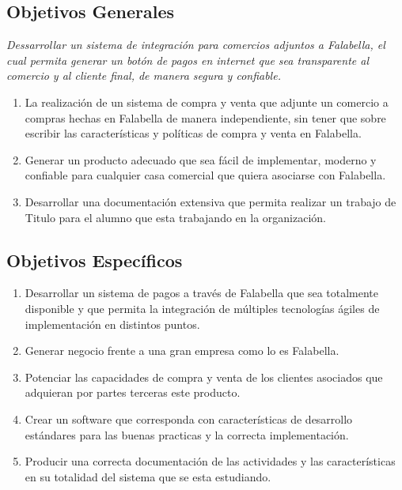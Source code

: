 \documentclass[a4paper,12pt,openany,oneside]{book}
\begin{document}
\subsection{Objetivos Generales}
\textit{Dessarrollar un sistema de integración para comercios adjuntos a Falabella, el cual permita generar un botón de pagos en internet que sea transparente al comercio y al cliente final, de manera segura y confiable.}
\begin{enumerate}
\item La realización de un sistema de compra y venta que adjunte un comercio a compras hechas en Falabella de manera independiente, sin tener que sobre escribir las características y políticas de compra y venta en Falabella.
\item Generar un producto adecuado que sea fácil de implementar, moderno y confiable para cualquier casa comercial que quiera asociarse con Falabella.
\item Desarrollar una documentación extensiva que permita realizar un trabajo de Titulo para el alumno que esta trabajando en la organización.
\end{enumerate}
\subsection{Objetivos Específicos}
\begin{enumerate}
\item Desarrollar un sistema de pagos a través de Falabella que sea totalmente disponible y que permita la integración de múltiples tecnologías ágiles de implementación en distintos puntos.
\item Generar negocio frente a una gran empresa como lo es Falabella.
\item Potenciar las capacidades de compra y venta de los clientes asociados que adquieran por partes terceras este producto.
\item Crear un software que corresponda con características de desarrollo estándares para las buenas practicas y la correcta implementación.
\item Producir una correcta documentación de las actividades y las características en su totalidad del sistema que se esta estudiando.
\end{enumerate}
\end{document}
